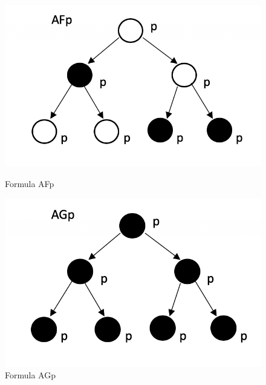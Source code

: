 \begin{figure}[H]
	\centering
	\begin{minipage}{.5\textwidth}
	  \centering
	  \includegraphics[width=1\linewidth]{images/AF}
	  \caption[Formula AFp]{Formula AFp}
	  \label{obr:AF}
	\end{minipage}%
	\begin{minipage}{.5\textwidth}
	  \centering
	  \includegraphics[width=.95\linewidth]{images/AG}
	  \caption[Formula AGp]{Formula AGp}
	  \label{obr:AG}
	\end{minipage}
\end{figure}

